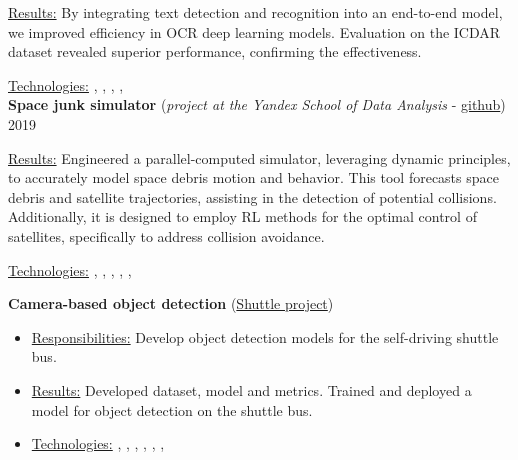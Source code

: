 \underline{Results:} By integrating text detection and recognition into an end-to-end model, we improved efficiency in OCR deep learning models. Evaluation on the ICDAR dataset revealed superior performance, confirming the effectiveness.

\underline{Technologies:} , , , , 
\\
\textbf{Space junk simulator} (\textit{project at the Yandex School of Data Analysis} - \href{https://github.com/neer201/space_junk_simulator}{github})   \hfill 2019
\par
\underline{Results:} Engineered a parallel-computed simulator, leveraging dynamic principles, to accurately model space debris motion and behavior. This tool forecasts space debris and satellite trajectories, assisting in the detection of potential collisions. Additionally, it is designed to employ RL methods for the optimal control of satellites, specifically to address collision avoidance.

\underline{Technologies:} , , , , , 
% 
\pagebreak
\\

\textbf{Camera-based object detection} (\href{https://www.engadget.com/2016/08/28/yandex-teams-on-self-driving-shuttle-bus/}{Shuttle project})
\begin{itemize}
    \item[] \underline{Responsibilities:} Develop object detection models for the self-driving shuttle bus.
    \item[] \underline{Results:} Developed dataset, model and metrics. Trained and deployed a model for object detection on the shuttle bus.
    \item[] \underline{Technologies:}  , , , , , , 
\end{itemize}

